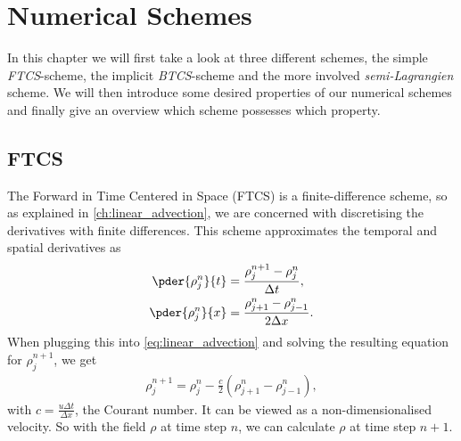 \section{Numerical Schemes}
In this chapter we will first take a look at three different schemes, the simple \textit{FTCS}-scheme, the implicit \textit{BTCS}-scheme and the more involved \textit{semi-Lagrangien} scheme. We will then introduce some desired properties of our numerical schemes and finally give an overview which scheme possesses which property.
\subsection{FTCS}
The Forward in Time Centered in Space (FTCS) is a finite-difference scheme, so as explained in \cref{ch:linear_advection}, we are concerned with discretising the derivatives with finite differences. This scheme approximates the temporal and spatial derivatives as
\begin{align}
\pder{\rho^n_j}{t}&=\frac{\rho_j^{n+1}-\rho_j^n}{\Delta t},\\
\pder{\rho^n_j}{x}&=\frac{\rho_{j+1}^{n}-\rho_{j-1}^n}{2\Delta x}.
\end{align}
When plugging this into \cref{eq:linear_advection} and solving the resulting equation for $\rho^{n+1}_j$, we get
\begin{align}					
\rho^{n+1}_j = \rho_j^{n}-\frac c2\left(\rho^n_{j+1}-\rho_{j-1}^n\right),
\end{align}
with $c=\frac{u\Delta t}{\Delta x}$, the Courant number. It can be viewed as a non-dimensionalised velocity. So with the field $\rho$ at time step $n$, we can calculate $\rho$ at time step $n+1$.
